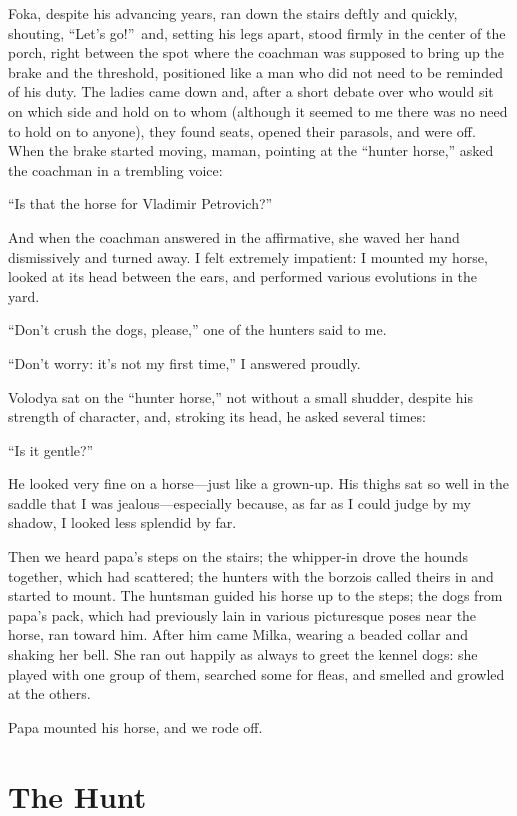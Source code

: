Foka, despite his advancing years, ran down the stairs deftly and quickly, shouting, ``Let's go!''~and, setting his legs apart, stood firmly in the center of the porch, right between the spot where the coachman was supposed to bring up the brake and the threshold, positioned like a man who did not need to be reminded of his duty. The ladies came down and, after a short debate over who would sit on which side and hold on to whom (although it seemed to me there was no need to hold on to anyone), they found seats, opened their parasols, and were off. When the brake started moving, maman, pointing at the ``hunter horse,'' asked the coachman in a trembling voice:

``Is that the horse for Vladimir Petrovich?'' %

And when the coachman answered in the affirmative, she waved her hand dismissively and turned away. I felt extremely impatient: I mounted my horse, looked at its head between the ears, and performed various evolutions in the yard.

``Don't crush the dogs, please,'' one of the hunters said to me. %

``Don't worry: it's not my first time,'' I answered proudly. %

Volodya sat on the ``hunter horse,'' not without a small shudder, despite his strength of character, and, stroking its head, he asked several times:

``Is it gentle?'' %

He looked very fine on a horse---just like a grown-up. His thighs sat so well in the saddle that I was jealous---especially because, as far as I could judge by my shadow, I looked less splendid by far.

Then we heard papa's steps on the stairs; the whipper-in drove the hounds together, which had scattered; the hunters with the borzois called theirs in and started to mount. The huntsman guided his horse up to the steps; the dogs from papa's pack, which had previously lain in various picturesque poses near the horse, ran toward him. After him came Milka, wearing a beaded collar and shaking her bell. She ran out happily as always to greet the kennel dogs: she played with one group of them, searched some for fleas, and smelled and growled at the others.

Papa mounted his horse, and we rode off.

\chapter{The Hunt} %

